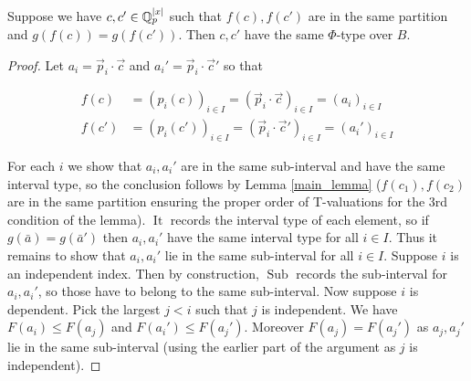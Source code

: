 \documentclass{amsart}
\DeclareMathOperator{\It}{It}
\DeclareMathOperator{\Sub}{Sub}
\begin{document}
\begin{Lemma}
  Suppose we have $c, c' \in \mathbb{Q}_p^{|x|}$ such that $f(c), f(c')$ are in the same partition and $g(f(c)) = g(f(c'))$.
  Then $c, c'$ have the same $\Phi$-type over $B$.
\end{Lemma}

\begin{proof}
  Let $a_i = \vec p_i \cdot \vec c$ and $a_i' = \vec p_i \cdot \vec c'$ so that

  \begin{align*}
    f(c) &= (p_i(c))_{i \in I} = (\vec p_i \cdot \vec c)_{i \in I} = (a_i)_{i \in I} \\
    f(c') &= (p_i(c'))_{i \in I} = (\vec p_i \cdot \vec c')_{i \in I} = (a_i')_{i \in I}
  \end{align*}

  For each $i$ we show that $a_i, a_i'$ are in the same sub-interval and have the same interval type, so the conclusion follows by Lemma \ref{main_lemma}
  ($f(c_1), f(c_2)$ are in the same partition ensuring the proper order of T-valuations for the 3rd condition of the lemma).
  $\It$ records the interval type of each element, so if $g(\bar a) = g(\bar a')$ then $a_i, a_i'$ have the same interval type for all $i \in I$.
  Thus it remains to show that $a_i, a_i'$ lie in the same sub-interval for all $i \in I$.
  Suppose $i$ is an independent index.
  Then by construction, $\Sub$ records the sub-interval for $a_i, a_i'$, so those have to belong to the same sub-interval.
  Now suppose $i$ is dependent.
  Pick the largest $j < i$ such that $j$ is independent.
  We have $F(a_i) \leq F(a_j)$ and $F(a_i') \leq F(a_j')$.
  Moreover $F(a_j) = F(a_j')$ as $a_j, a_j'$ lie in the same sub-interval (using the earlier part of the argument as $j$ is independent).
  

\end{proof}
\end{document}

